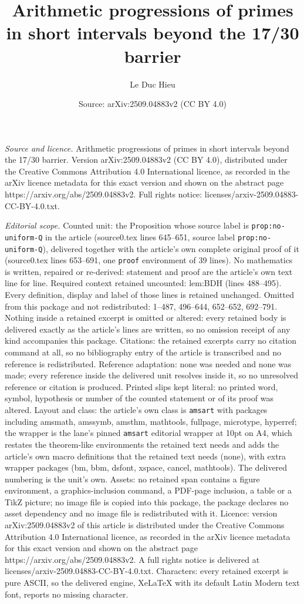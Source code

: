 \documentclass[10pt,a4paper]{amsart}
\title[Arithmetic progressions of primes in short intervals beyond ]{Arithmetic progressions of primes in short intervals beyond the 17/30 barrier}
\author{Le Duc Hieu}
\date{Source: arXiv:2509.04883v2 (CC BY 4.0)}
\begin{document}
\maketitle

\noindent\emph{Source and licence.} Arithmetic progressions of primes in short intervals beyond the 17/30 barrier. Version arXiv:2509.04883v2 (CC BY 4.0), distributed under the Creative Commons Attribution 4.0 International licence, as recorded in the arXiv licence metadata for this exact version and shown on the abstract page https://arxiv.org/abs/2509.04883v2. Full rights notice: licenses/arxiv-2509.04883-CC-BY-4.0.txt.\par\smallskip

\noindent\textit{Editorial scope.} Counted unit: the Proposition whose source label is \texttt{prop:no-uniform-Q} in the article (source0.tex lines 645--651, source label \texttt{prop:no-uniform-Q}), delivered together with the article's own complete original proof of it (source0.tex lines 653--691, one \texttt{proof} environment of 39 lines). No mathematics is written, repaired or re-derived: statement and proof are the article's own text line for line. Required context retained uncounted: lem:BDH (lines 488--495). Every definition, display and label of those lines is retained unchanged. Omitted from this package and not redistributed: 1--487, 496--644, 652--652, 692--791. Nothing inside a retained excerpt is omitted or altered: every retained body is delivered exactly as the article's lines are written, so no omission receipt of any kind accompanies this package. Citations: the retained excerpts carry no citation command at all, so no bibliography entry of the article is transcribed and no reference is redistributed. Reference adaptation: none was needed and none was made; every reference inside the delivered unit resolves inside it, so no unresolved reference or citation is produced. Printed slips kept literal: no printed word, symbol, hypothesis or number of the counted statement or of its proof was altered. Layout and class: the article's own class is \texttt{amsart} with packages including amsmath, amssymb, amsthm, mathtools, fullpage, microtype, hyperref; the wrapper is the lane's pinned \texttt{amsart} editorial wrapper at 10pt on A4, which restates the theorem-like environments the retained text needs and adds the article's own macro definitions that the retained text needs (none), with extra wrapper packages (bm, bbm, dsfont, xspace, cancel, mathtools). The delivered numbering is the unit's own. Assets: no retained span contains a figure environment, a graphics-inclusion command, a PDF-page inclusion, a table or a TikZ picture; no image file is copied into this package, the package declares no asset dependency and no image file is redistributed with it. Licence: version arXiv:2509.04883v2 of this article is distributed under the Creative Commons Attribution 4.0 International licence, as recorded in the arXiv licence metadata for this exact version and shown on the abstract page https://arxiv.org/abs/2509.04883v2. A full rights notice is delivered at licenses/arxiv-2509.04883-CC-BY-4.0.txt. Characters: every retained excerpt is pure ASCII, so the delivered engine, XeLaTeX with its default Latin Modern text font, reports no missing character.
\end{document}
